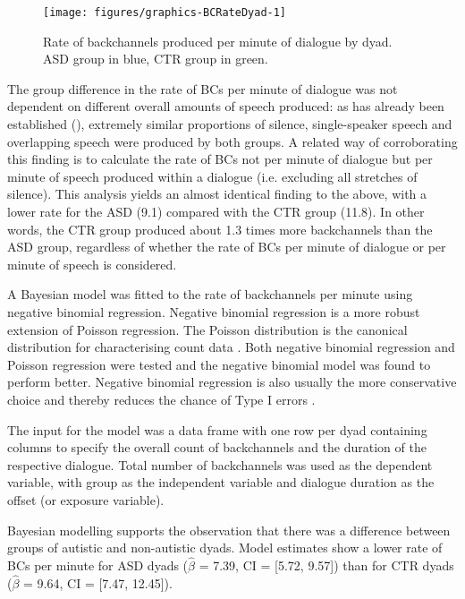 \begin{figure}

{\texttt{[image: figures/graphics-BCRateDyad-1]}
	
}

\caption{Rate of backchannels produced per minute of dialogue by dyad. ASD group in blue, CTR group in green.}\label{fig:BCRateDyad}
\end{figure}

The group difference in the rate of BCs per minute of dialogue was not dependent on different overall amounts of speech produced: as has already been established (), extremely similar proportions of silence, single-speaker speech and overlapping speech were produced by both groups. A related way of corroborating this finding is to calculate the rate of BCs not per minute of dialogue but per minute of speech produced within a dialogue (i.e. excluding all stretches of silence). This analysis yields an almost identical finding to the above, with a lower rate for the ASD (9.1) compared with the CTR group (11.8). In other words, the CTR group produced about 1.3 times more backchannels than the ASD group, regardless of whether the rate of BCs per minute of dialogue or per minute of speech is considered.

\label{BCFP_BC_results_BCRate_Bayes}

A Bayesian model was fitted to the rate of backchannels per minute using negative binomial regression. Negative binomial regression is a more robust extension of Poisson regression. The Poisson distribution is the canonical distribution for characterising count data \citep{winterPoissonRegressionLinguists2021a}. Both negative binomial regression and Poisson regression were tested and the negative binomial model was found to perform better. Negative binomial regression is also usually the more conservative choice and thereby reduces the chance of Type I errors \citep{winterPoissonRegressionLinguists2021a}.

The input for the model was a data frame with one row per dyad containing columns to specify the overall count of backchannels and the duration of the respective dialogue. Total number of backchannels was used as the dependent variable, with group as the independent variable and dialogue duration as the offset (or exposure variable).

Bayesian modelling supports the observation that there was a difference between groups of autistic and non-autistic dyads. Model estimates show a lower rate of BCs per minute for ASD dyads (\(\hat{\beta}\) = 7.39, CI = {[}5.72, 9.57{]}) than for CTR dyads (\(\hat{\beta}\) = 9.64, CI = {[}7.47, 12.45{]}).


